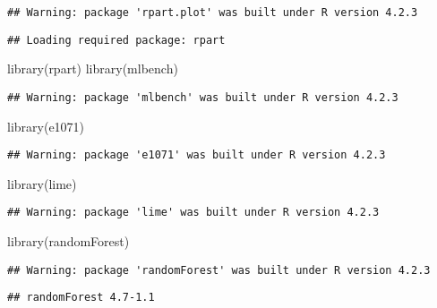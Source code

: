 \documentclass[
]{article}
\newenvironment{Shaded}{\begin{snugshade}}{\end{snugshade}}
\newcommand{\FunctionTok}[1]{\textcolor[rgb]{0.00,0.00,0.00}{#1}}
\newcommand{\NormalTok}[1]{#1}
\begin{document}
\begin{verbatim}
## Warning: package 'rpart.plot' was built under R version 4.2.3
\end{verbatim}

\begin{verbatim}
## Loading required package: rpart
\end{verbatim}

\begin{Shaded}
\begin{Highlighting}[]
\FunctionTok{library}\NormalTok{(rpart)}
\FunctionTok{library}\NormalTok{(mlbench)}
\end{Highlighting}
\end{Shaded}

\begin{verbatim}
## Warning: package 'mlbench' was built under R version 4.2.3
\end{verbatim}

\begin{Shaded}
\begin{Highlighting}[]
\FunctionTok{library}\NormalTok{(e1071)}
\end{Highlighting}
\end{Shaded}

\begin{verbatim}
## Warning: package 'e1071' was built under R version 4.2.3
\end{verbatim}

\begin{Shaded}
\begin{Highlighting}[]
\FunctionTok{library}\NormalTok{(lime)}
\end{Highlighting}
\end{Shaded}

\begin{verbatim}
## Warning: package 'lime' was built under R version 4.2.3
\end{verbatim}

\begin{Shaded}
\begin{Highlighting}[]
\FunctionTok{library}\NormalTok{(randomForest)}
\end{Highlighting}
\end{Shaded}

\begin{verbatim}
## Warning: package 'randomForest' was built under R version 4.2.3
\end{verbatim}

\begin{verbatim}
## randomForest 4.7-1.1
\end{verbatim}
\end{document}
